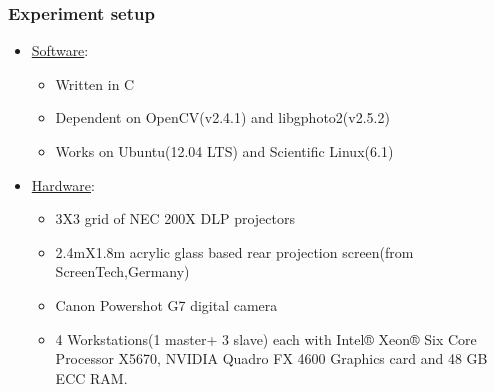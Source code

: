 \documentclass[40pt]{beamer}
\begin{document}

\begin{frame}[label=sysconfg]
\frametitle{Experiment setup}
\begin{itemize}
\item \underline{Software}:
\begin{itemize}
\item Written in C
\item Dependent on OpenCV(v2.4.1) and libgphoto2(v2.5.2)
\item Works on Ubuntu(12.04 LTS) and Scientific Linux(6.1)
\end{itemize}      
\item \underline{Hardware}:
\begin{itemize}
\item 3X3 grid of NEC 200X DLP projectors
\item 2.4mX1.8m acrylic glass based rear projection screen(from ScreenTech,Germany)
\item Canon Powershot G7 digital camera
\item 4 Workstations(1 master+ 3 slave) each with Intel® Xeon® Six Core Processor X5670, NVIDIA Quadro FX 4600 Graphics card and 48 GB ECC RAM.
\end{itemize}
\end{itemize}
\end{frame}

\end{document}
